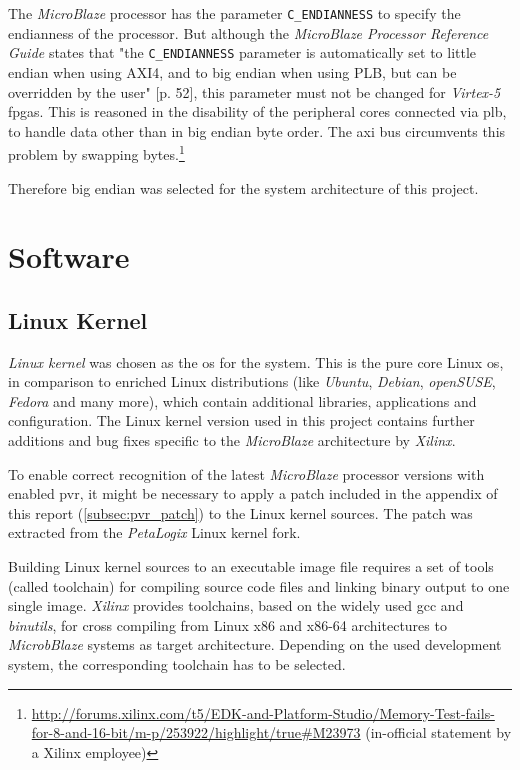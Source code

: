 The \textit{MicroBlaze} processor has the parameter \texttt{C\_ENDIANNESS} to specify the endianness of the processor. But although the \textit{MicroBlaze Processor Reference Guide} states that "the \texttt{C\_ENDIANNESS} parameter is automatically set to little endian when using AXI4, and to big endian when using PLB, but can be overridden by the user" \cite{mb_ref}[p. 52], this parameter must not be changed for \textit{Virtex-5} \gls{fpga}s. This is reasoned in the disability of the peripheral cores connected via \gls{plb}, to handle data other than in big endian byte order. The \gls{axi} bus circumvents this problem by swapping bytes.\footnote{\url{http://forums.xilinx.com/t5/EDK-and-Platform-Studio/Memory-Test-fails-for-8-and-16-bit/m-p/253922/highlight/true\#M23973} (in-official statement by a Xilinx employee)}

Therefore big endian was selected for the system architecture of this project.

\clearpage
\section{Software}

\subsection{Linux Kernel}

\textit{Linux kernel} was chosen as the \gls{os} for the system. This is the pure core Linux \gls{os}, in comparison to enriched Linux distributions (like \textit{Ubuntu}, \textit{Debian}, \textit{openSUSE}, \textit{Fedora} and many more), which contain additional libraries, applications and configuration. The Linux kernel version used in this project contains further additions and bug fixes specific to the \textit{MicroBlaze} architecture by \textit{Xilinx}.

To enable correct recognition of the latest \textit{MicroBlaze} processor versions with enabled \gls{pvr}, it might be necessary to apply a patch included in the appendix of this report (\ref{subsec:pvr_patch}) to the Linux kernel sources. The patch was extracted from the \textit{PetaLogix} Linux kernel fork.

Building Linux kernel sources to an executable image file requires a set of tools (called toolchain) for compiling source code files and linking binary output to one single image. \textit{Xilinx} provides toolchains, based on the widely used \gls{gcc} and \textit{binutils}, for cross compiling from Linux x86 and x86-64 architectures to \textit{MicrobBlaze} systems as target architecture. Depending on the used development system, the corresponding toolchain has to be selected.
\\

